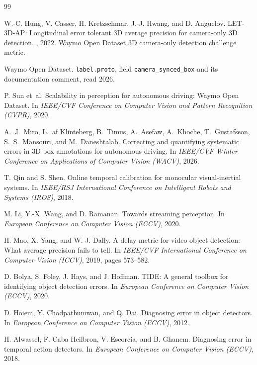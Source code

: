 \documentclass[10pt,twocolumn,letterpaper]{article}
\begin{document}
{\footnotesize
\setlength{\itemsep}{0.4pt}
\clearpage
\begin{thebibliography}{99}

W.-C. Hung, V. Casser, H. Kretzschmar, J.-J. Hwang, and D. Anguelov.
\newblock LET-3D-AP: Longitudinal error tolerant 3D average precision for
camera-only 3D detection.
, 2022. Waymo Open Dataset 3D camera-only
detection challenge metric.

Waymo Open Dataset.
\newblock \texttt{label.proto}, field \texttt{camera\_synced\_box} and its
documentation comment, read 2026.

P. Sun et~al.
\newblock Scalability in perception for autonomous driving: Waymo Open Dataset.
\newblock In {\em IEEE/CVF Conference on Computer Vision and Pattern Recognition
(CVPR)}, 2020.

A.~J.~Miro, L.~af Klinteberg, B.~Timus, A.~Asefaw, A.~Khoche, T.~Gustafsson,
S.~S.~Mansouri, and M.~Daneshtalab.
\newblock Correcting and quantifying systematic errors in 3D box annotations for
autonomous driving.
\newblock In {\em IEEE/CVF Winter Conference on Applications of Computer Vision
(WACV)}, 2026.

T. Qin and S. Shen.
\newblock Online temporal calibration for monocular visual-inertial systems.
\newblock In {\em IEEE/RSJ International Conference on Intelligent Robots and
Systems (IROS)}, 2018.

M. Li, Y.-X. Wang, and D. Ramanan.
\newblock Towards streaming perception.
\newblock In {\em European Conference on Computer Vision (ECCV)}, 2020.

H. Mao, X. Yang, and W. J. Dally.
\newblock A delay metric for video object detection: What average precision
fails to tell.
\newblock In {\em IEEE/CVF International Conference on Computer Vision (ICCV)},
2019, pages 573--582.

D. Bolya, S. Foley, J. Hays, and J. Hoffman.
\newblock TIDE: A general toolbox for identifying object detection errors.
\newblock In {\em European Conference on Computer Vision (ECCV)}, 2020.

D. Hoiem, Y. Chodpathumwan, and Q. Dai.
\newblock Diagnosing error in object detectors.
\newblock In {\em European Conference on Computer Vision (ECCV)}, 2012.

H. Alwassel, F. Caba Heilbron, V. Escorcia, and B. Ghanem.
\newblock Diagnosing error in temporal action detectors.
\newblock In {\em European Conference on Computer Vision (ECCV)}, 2018.


\end{thebibliography}}
\end{document}
